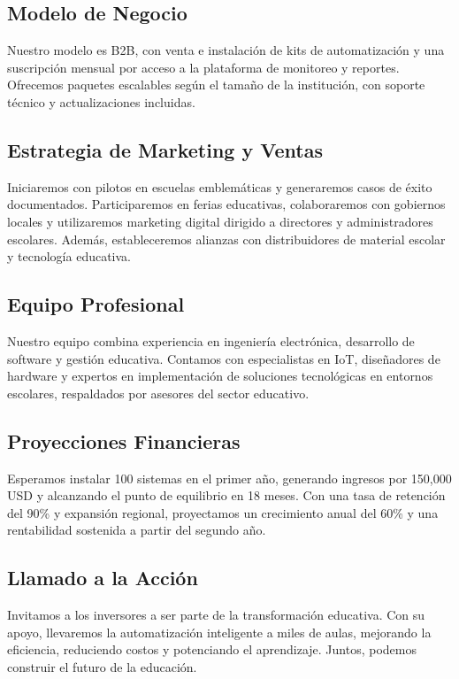 \subsection{Modelo de Negocio}

Nuestro modelo es B2B, con venta e instalación de kits de automatización y una suscripción mensual por acceso a la plataforma de monitoreo y reportes. Ofrecemos paquetes escalables según el tamaño de la institución, con soporte técnico y actualizaciones incluidas.

\subsection{Estrategia de Marketing y Ventas}

Iniciaremos con pilotos en escuelas emblemáticas y generaremos casos de éxito documentados. Participaremos en ferias educativas, colaboraremos con gobiernos locales y utilizaremos marketing digital dirigido a directores y administradores escolares. Además, estableceremos alianzas con distribuidores de material escolar y tecnología educativa.

\subsection{Equipo Profesional}

Nuestro equipo combina experiencia en ingeniería electrónica, desarrollo de software y gestión educativa. Contamos con especialistas en IoT, diseñadores de hardware y expertos en implementación de soluciones tecnológicas en entornos escolares, respaldados por asesores del sector educativo.

\subsection{Proyecciones Financieras}

Esperamos instalar 100 sistemas en el primer año, generando ingresos por 150,000 USD y alcanzando el punto de equilibrio en 18 meses. Con una tasa de retención del 90\% y expansión regional, proyectamos un crecimiento anual del 60\% y una rentabilidad sostenida a partir del segundo año.

\subsection{Llamado a la Acción}

Invitamos a los inversores a ser parte de la transformación educativa. Con su apoyo, llevaremos la automatización inteligente a miles de aulas, mejorando la eficiencia, reduciendo costos y potenciando el aprendizaje. Juntos, podemos construir el futuro de la educación.